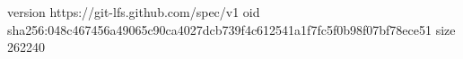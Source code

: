 version https://git-lfs.github.com/spec/v1
oid sha256:048c467456a49065c90ca4027dcb739f4c612541a1f7fc5f0b98f07bf78ece51
size 262240
